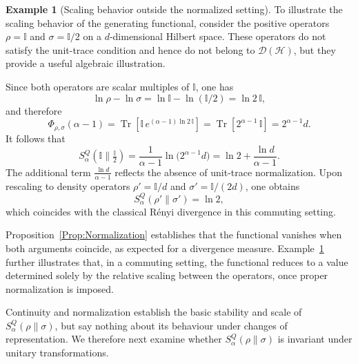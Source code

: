 \documentclass[a4paper, amsfonts, amssymb, amsmath, reprint, showkeys, nofootinbib, twoside, aps, pra]{revtex4-2}
\theoremstyle{definition}
\newtheorem{example}{Example}
\begin{document}
\begin{example}[Scaling behavior outside the normalized setting]
\label{ex:scaling}
To illustrate the scaling behavior of the generating functional, consider the positive operators $\rho=\mathbb{I}$ and $\sigma=\mathbb{I}/2$ on a $d$-dimensional Hilbert space. These operators do not satisfy the unit-trace condition and hence do not belong to $\mathcal{D}(\mathcal{H})$, but they provide a useful algebraic illustration.

Since both operators are scalar multiples of $\mathbb{I}$, one has
\begin{equation}
    \ln\rho - \ln\sigma
    =
    \ln\mathbb{I} - \ln(\mathbb{I}/2)
    =
    \ln 2\,\mathbb{I},
\end{equation}
and therefore
\begin{equation}
    \Phi_{\rho,\sigma}(\alpha-1)
    =
    \operatorname{Tr}\!\left[
    \mathbb{I}\,e^{(\alpha-1)\ln 2\,\mathbb{I}}
    \right]
    =
    \operatorname{Tr}\!\left[2^{\alpha-1}\,\mathbb{I}\right]
    =
    2^{\alpha-1} d.
\end{equation}
It follows that
\begin{equation}
    S^Q_\alpha(\mathbb{I}\|\tfrac{\mathbb{I}}{2})
    =
    \frac{1}{\alpha-1}\ln\bigl(2^{\alpha-1} d\bigr)
    =
    \ln 2 + \frac{\ln d}{\alpha-1}.
\end{equation}
The additional term $\frac{\ln d}{\alpha-1}$ reflects the absence of 
unit-trace normalization. Upon rescaling to density operators 
$\rho'=\mathbb{I}/d$ and $\sigma'=\mathbb{I}/(2d)$, one obtains
\begin{equation}
    S^Q_\alpha(\rho'\|\sigma')
    =
    \ln 2,
\end{equation}
which coincides with the classical Rényi divergence in this commuting setting.
\end{example}

\medskip

Proposition~\ref{Prop:Normalization} establishes that the functional vanishes when both arguments coincide, as expected for a divergence measure. Example~\ref{ex:scaling} further illustrates that, in a commuting setting, the functional reduces to a value determined solely by the relative scaling between the operators, once proper normalization is imposed.

Continuity and normalization establish the basic stability and scale of $S^Q_\alpha(\rho\|\sigma)$, but say nothing about its behaviour under changes of representation. We therefore next examine whether $S^Q_\alpha(\rho\|\sigma)$ is invariant under unitary transformations.
\end{document}
